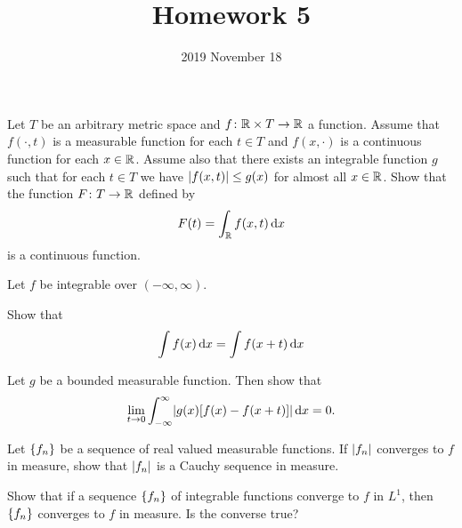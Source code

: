 \documentclass{../homework}
\title{Homework 5}
\author{}
\date{2019 November 18}
\begin{document}
\begin{problems}
\item Let \(T\) be an arbitrary metric space and
  \(f \colon \mathbb R \times T \to \mathbb R\) a function.  Assume that
  \(f(\cdot, t)\) is a measurable function for each \(t \in T\) and
  \(f(x, \cdot)\) is a continuous function for each \(x \in \mathbb R\).
  Assume also that there exists an integrable function \(g\) such that
  for each \(t \in T\) we have \(\lvert f(x, t)\rvert \le g(x)\) for almost
  all \(x \in \mathbb R\).  Show that the function \(F \colon T \to \mathbb R\)
  defined by
  \[
    F(t) = \int_\mathbb R f(x, t) \mathop{}\!\mathrm d x
  \]
  is a continuous function.

  \begin{solution}
  \end{solution}

\item Let \(f\) be integrable over \((-\infty, \infty)\).
  \begin{problems}
  \item Show that
    \[
      \int f(x) \mathop{}\!\mathrm d x = \int f(x+t) \mathop{}\!\mathrm d x
    \]

    \begin{solution}
    \end{solution}

  \item Let \(g\) be a bounded measurable function.  Then show that
    \[
      \lim_{t\to0} \int_{-\infty}^\infty
      \abs*{g(x) \sbr*{f(x)-f(x+t)}} \dif x = 0.
    \]

    \begin{solution}
    \end{solution}

  \end{problems}

\item
  \begin{problems}
  \item Let \(\{f_n\}\) be a sequence of real valued measurable
    functions.  If \(\lvert f_n\rvert\) converges to \(f\) in measure, show
    that \(\lvert f_n\rvert\) is a Cauchy sequence in measure.

    \begin{solution}
    \end{solution}

  \item Show that if a sequence \(\{f_n\}\) of integrable functions
    converge to \(f\) in \(L^1\), then \(\{f_n\}\) converges to
    \(f\) in measure.  Is the converse true?


\end{problems}
\end{problems}
\end{document}
